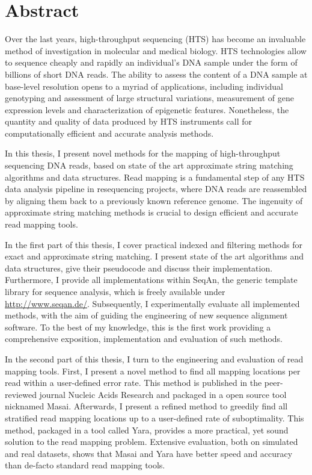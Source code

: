 \section*{Abstract}
\label{sec:abstract:en}

Over the last years, high-throughput sequencing (HTS) has become an invaluable method of investigation in molecular  and medical biology.
HTS technologies allow to sequence cheaply and rapidly an individual's DNA sample under the form of billions of short DNA reads.
The ability to assess the content of a DNA sample at base-level resolution opens to a myriad of applications, including individual genotyping and assessment of large structural variations, measurement of gene expression levels and characterization of epigenetic features.
Nonetheless, the quantity and quality of data produced by HTS instruments call for computationally efficient and accurate analysis methods.

In this thesis, I present novel methods for the mapping of high-throughput sequencing DNA reads, based on state of the art approximate string matching algorithms and data structures.
Read mapping is a fundamental step of any HTS data analysis pipeline in resequencing projects, where DNA reads are reassembled by aligning them back to a previously known reference genome.
The ingenuity of approximate string matching methods is crucial to design efficient and accurate read mapping tools.

In the first part of this thesis, I cover practical indexed and filtering methods for exact and approximate string matching.
I present state of the art algorithms and data structures, give their pseudocode and discuss their implementation.
Furthermore, I provide all implementations within SeqAn, the generic \CC template library for sequence analysis, which is freely available under \url{http://www.seqan.de/}.
Subsequently, I experimentally evaluate all implemented methods, with the aim of guiding the engineering of new sequence alignment software.
To the best of my knowledge, this is the first work providing a comprehensive exposition, implementation and evaluation of such methods.

In the second part of this thesis, I turn to the engineering and evaluation of read mapping tools.
First, I present a novel method to find all mapping locations per read within a user-defined error rate.
This method is published in the peer-reviewed journal Nucleic Acids Research and packaged in a open source tool nicknamed Masai.
Afterwards, I present a refined method to greedily find all stratified read mapping locations up to a user-defined rate of suboptimality.
This method, packaged in a tool called Yara, provides a more practical, yet sound solution to the read mapping problem.
Extensive evaluation, both on simulated and real datasets, shows that Masai and Yara have better speed and accuracy than de-facto standard read mapping tools.


\newpage

